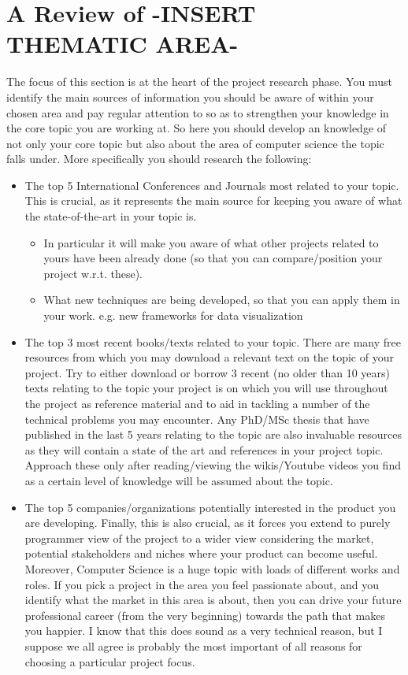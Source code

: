 \section{A Review of -INSERT THEMATIC AREA-}
The focus of this section is at the heart of the project research phase. You must identify the main sources of information you should be aware of within your chosen area and pay regular attention to so as to strengthen your knowledge in the core topic you are working at. So here you should develop an knowledge of not only your core topic but also about the area of computer science the topic falls under. More specifically you should research the following:
\begin{itemize}
    \item The top 5 International Conferences and Journals most related to your topic. This is crucial, as it represents the main source for keeping you aware of what the state-of-the-art in your topic is.
    \begin{itemize}
        \item In particular it will make you aware of what other projects related to yours have been already done (so that you can compare/position your project w.r.t. these).
        \item What new techniques are being developed, so that you can apply them in your work. e.g. new frameworks for data visualization
    \end{itemize}
    \item The top 3 most recent books/texts related to your topic. There are many free resources from which you may download a relevant text on the topic of your project. Try to either download or borrow 3 recent (no older than 10 years) texts relating to the topic your project is on which you will use throughout the project as reference material and to aid in tackling a number of the technical problems you may encounter. Any PhD/MSc thesis that have published in the last 5 years relating to the topic are also invaluable resources as they will contain a state of the art and references in your project topic. Approach these only after reading/viewing the wikis/Youtube videos you find as a certain level of knowledge will be assumed about the topic.
    \item The top 5 companies/organizations potentially interested in the product you are developing. Finally, this is also crucial, as it forces you extend to purely programmer view of the project to a wider view considering the market, potential stakeholders and niches where your product can become useful. Moreover, Computer Science is a huge topic with loads of different works and roles. If you pick a project in the area you feel passionate about, and you identify what the market in this area is about, then you can drive your future professional career (from the very beginning) towards the path that makes you happier. I know that this does sound as a very technical reason, but I suppose we all agree is probably the most important of all reasons for choosing a particular project focus. 

\end{itemize}
